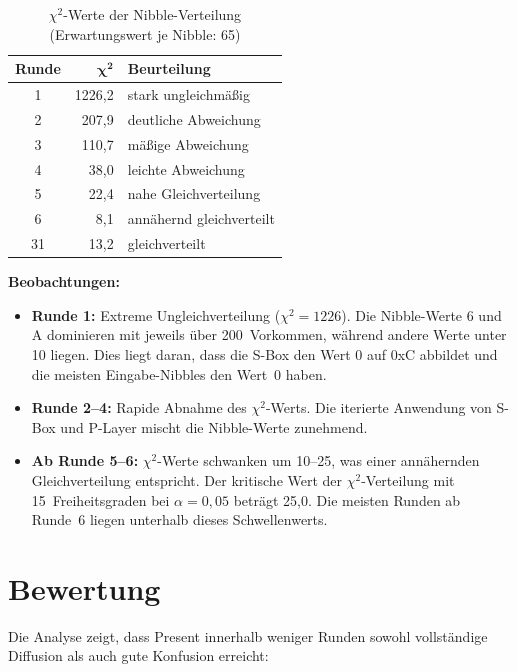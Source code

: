 \documentclass[
    fontsize=12pt,          %
    paper=a4,               %
    numbers=noenddot,       %
    listof=totoc,           %
    listof=entryprefix,     %
    listof=nochaptergap,    %
    bibliography=totoc,     %
    parskip=half,           %
    openany                 %
]{scrbook}
\begin{document}
\begin{table}[H]
    \centering
    \begin{tabular}{c r l}
        \toprule
        \textbf{Runde} & $\boldsymbol{\chi^2}$ & \textbf{Beurteilung} \\
        \midrule
        1  & 1226{,}2 & stark ungleichmäßig \\
        2  & 207{,}9  & deutliche Abweichung \\
        3  & 110{,}7  & mäßige Abweichung \\
        4  & 38{,}0   & leichte Abweichung \\
        5  & 22{,}4   & nahe Gleichverteilung \\
        6  & 8{,}1    & annähernd gleichverteilt \\
        \midrule
        31 & 13{,}2   & gleichverteilt \\
        \bottomrule
    \end{tabular}
    \caption{$\chi^2$-Werte der Nibble-Verteilung (Erwartungswert je Nibble: 65)}
\end{table}

\textbf{Beobachtungen:}
\begin{itemize}
    \item \textbf{Runde 1:} Extreme Ungleichverteilung ($\chi^2 = 1226$).
    Die Nibble-Werte 6 und A dominieren mit jeweils über 200~Vorkommen, während andere Werte unter 10 liegen.
    Dies liegt daran, dass die S-Box den Wert 0 auf 0xC abbildet und die meisten Eingabe-Nibbles den Wert~0 haben.
    \item \textbf{Runde 2--4:} Rapide Abnahme des $\chi^2$-Werts.
    Die iterierte Anwendung von S-Box und P-Layer mischt die Nibble-Werte zunehmend.
    \item \textbf{Ab Runde 5--6:} $\chi^2$-Werte schwanken um 10--25, was einer annähernden Gleichverteilung entspricht.
    Der kritische Wert der $\chi^2$-Verteilung mit 15~Freiheitsgraden bei $\alpha = 0{,}05$ beträgt 25{,}0.
    Die meisten Runden ab Runde~6 liegen unterhalb dieses Schwellenwerts.
\end{itemize}


\section*{Bewertung}

Die Analyse zeigt, dass Present innerhalb weniger Runden sowohl vollständige Diffusion als auch gute Konfusion erreicht:
\end{document}
